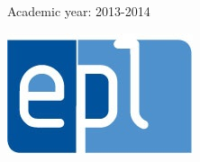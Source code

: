 \begin{titlepage}
\begin{center}
\begin{minipage}{0.25\textwidth}
\begin{flushleft}
\end{flushleft}
\end{minipage}
\begin{minipage}{0.48\textwidth}
\begin{center}
\Large{Academic year: 2013-2014}
\end{center}
\end{minipage}
\begin{minipage}{0.25\textwidth}
\begin{flushright}
\includegraphics[scale=0.5]{Couverture/epl-logo.jpg}
\end{flushright}
\end{minipage}
\end{center}
\end{titlepage}
\newpage
